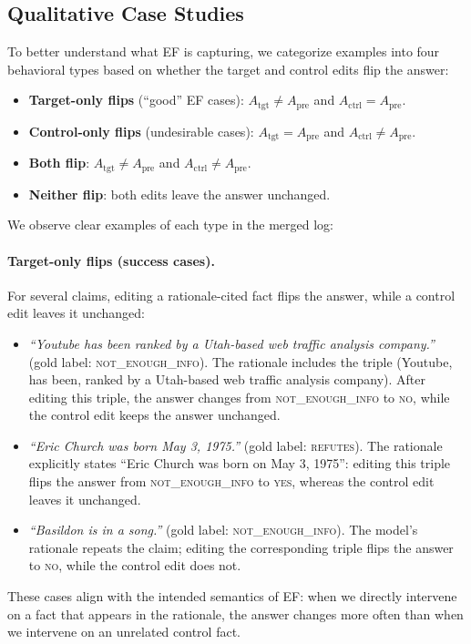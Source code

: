 \documentclass[11pt]{article}
\begin{document}
\subsection*{Qualitative Case Studies}

To better understand what EF is capturing, we categorize examples into four behavioral types based on whether the target and control edits flip the answer:
\begin{itemize}
  \item \textbf{Target-only flips} (``good'' EF cases): $A_{\text{tgt}} \neq A_{\text{pre}}$ and $A_{\text{ctrl}} = A_{\text{pre}}$.
  \item \textbf{Control-only flips} (undesirable cases): $A_{\text{tgt}} = A_{\text{pre}}$ and $A_{\text{ctrl}} \neq A_{\text{pre}}$.
  \item \textbf{Both flip}: $A_{\text{tgt}} \neq A_{\text{pre}}$ and $A_{\text{ctrl}} \neq A_{\text{pre}}$.
  \item \textbf{Neither flip}: both edits leave the answer unchanged.
\end{itemize}

We observe clear examples of each type in the merged log:

\paragraph{Target-only flips (success cases).}
For several claims, editing a rationale-cited fact flips the answer, while a control edit leaves it unchanged:
\begin{itemize}
  \item \emph{``Youtube has been ranked by a Utah-based web traffic analysis company.''} (gold label: \textsc{not\_enough\_info}). The rationale includes the triple (Youtube, has been, ranked by a Utah-based web traffic analysis company). After editing this triple, the answer changes from \textsc{not\_enough\_info} to \textsc{no}, while the control edit keeps the answer unchanged.
  \item \emph{``Eric Church was born May 3, 1975.''} (gold label: \textsc{refutes}). The rationale explicitly states ``Eric Church was born on May 3, 1975'': editing this triple flips the answer from \textsc{not\_enough\_info} to \textsc{yes}, whereas the control edit leaves it unchanged.
  \item \emph{``Basildon is in a song.''} (gold label: \textsc{not\_enough\_info}). The model's rationale repeats the claim; editing the corresponding triple flips the answer to \textsc{no}, while the control edit does not.
\end{itemize}
These cases align with the intended semantics of EF: when we directly intervene on a fact that appears in the rationale, the answer changes more often than when we intervene on an unrelated control fact.
\end{document}
